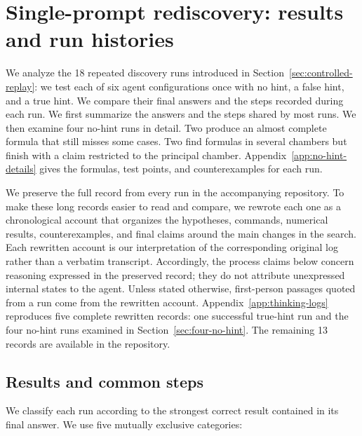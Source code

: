 \documentclass{article}
\begin{document}
\section{Single-prompt rediscovery: results and run histories}
\label{sec:single-prompt-results}

We analyze the 18 repeated discovery runs introduced in
Section~\ref{sec:controlled-replay}: we test each of six agent configurations
once with no hint, a false hint, and a true hint. We compare their final
answers and the steps recorded during each run. We first summarize the answers
and the steps shared by most runs. We then examine four no-hint runs in detail.
Two produce an almost complete formula that still misses some cases. Two find
formulas in several chambers but finish with a claim restricted to the
principal chamber. Appendix~\ref{app:no-hint-details} gives the formulas, test
points, and counterexamples for each run.

We preserve the full record from every run in the accompanying repository. To
make these long records easier to read and compare, we rewrote each one as a chronological
account that organizes the hypotheses, commands, numerical
results, counterexamples, and final claims around the main changes in the
search. Each rewritten account is our interpretation of the corresponding
original log rather than a verbatim transcript. Accordingly, the process
claims below concern reasoning expressed in the preserved record; they do not
attribute unexpressed internal states to the agent. Unless stated otherwise,
first-person passages quoted from a run come from the rewritten account.
Appendix~\ref{app:thinking-logs} reproduces five complete rewritten records:
one successful true-hint run and the four no-hint runs examined in
Section~\ref{sec:four-no-hint}. The remaining 13 records are available in the
repository.


\subsection{Results and common steps}

We classify each run according to the strongest correct result contained in
its final answer. We use five mutually exclusive categories:
\end{document}
